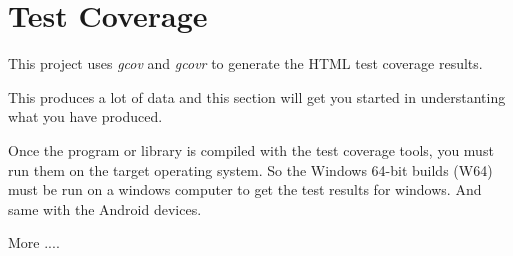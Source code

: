 \section{Test Coverage}
This project uses \textit{gcov} and \textit{gcovr} to generate the HTML
test coverage results.

This produces a lot of data and this section will get you
started in understanting what you have produced.

Once the program or library is compiled with the test coverage
tools, you must run them on the target operating system.
So the Windows 64-bit builds (W64) must be run on a windows
computer to get the test results for windows.
And same with the Android devices.

More ....

